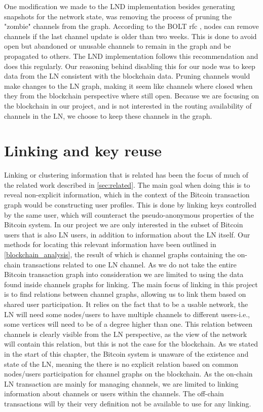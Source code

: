 
One modification we made to the LND implementation besides generating snapshots for the network state, was removing the process of pruning the "zombie" channels from the graph. According to the BOLT rfc \cite{bolt7}, nodes can remove channels if the last channel update is older than two weeks. This is done to avoid open but abandoned or unusable channels to remain in the graph and be propagated to others. The LND implementation follows this recommendation and does this regularly. Our reasoning behind disabling this for our node was to keep data from the LN consistent with the blockchain data. Pruning channels would make changes to the LN graph, making it seem like channels where closed when they from the blockchain perspective where still open. Because we are focusing on the blockchain in our project, and is not interested in the routing availability of channels in the LN, we choose to keep these channels in the graph.

\section{Linking and key reuse}
\label{sec:linking}

Linking or clustering information that is related has been the focus of much of the related work described in \cref{sec:related}. The main goal when doing this is to reveal non-explicit information, which in the context of the Bitcoin transaction graph would be constructing user profiles. 
This is done by linking keys controlled by the same user, which will counteract the pseudo-anonymous properties of the Bitcoin system. In our project we are only interested in the subset of Bitcoin users that is also LN users, in addition to information about the LN itself. 
Our methods for locating this relevant information have been outlined in \cref{blockchain_analysis}, the result of which is channel graphs containing the on-chain transactions related to one LN channel. 
As we do not take the entire Bitcoin transaction graph into consideration we are limited to using the data found inside channels graphs for linking. The main focus of linking in this project is to find relations between channel graphs, allowing us to link them based on shared user participation.
It relies on the fact that to be a usable network, the LN will need some nodes/users to have multiple channels to different users-i.e., some vertices will need to be of a degree higher than one. This relation between channels is clearly visible from the LN perspective, as the view of the network will contain this relation, but this is not the case for the blockchain. As we stated in the start of this chapter, the Bitcoin system is unaware of the existence and state of the LN, meaning the there is no explicit relation based on common nodes/users participation for channel graphs on the blockchain. As the on-chain LN transaction are mainly for managing channels, we are limited to linking information about channels or users within the channels. The off-chain transactions will by their very definition not be available to use for any linking.
\\

